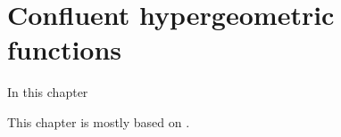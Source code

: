 \chapter{Confluent hypergeometric functions}
\label{chap:confluent}

\noindent 
In this chapter 

This chapter is mostly based on \textcite{Tricomi:1954,Tricomi:1962}.
